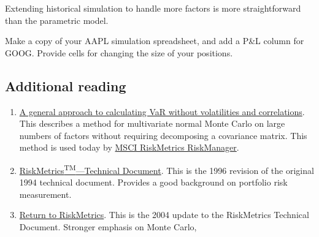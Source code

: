 \documentclass{report}
\numberwithin{problem}{chapter} %
\let\oldroblem\problem
\renewcommand{\problem}{ \oldroblem  \normalfont}
\newcommand{\pnl}{P\&L }
\begin{document}
Extending historical simulation to handle more factors is more straightforward than the parametric model.   

\problem Make a copy of your AAPL simulation spreadsheet, and add a \pnl column for GOOG. Provide cells for changing the size of your positions.



\begin{appendices}
\chapter{Additional reading}
\begin{enumerate}
\item{\href{http://pbenson.github.io/docs/rmm2q97bz.pdf}{A general approach to calculating VaR without volatilities and correlations}. This describes a method for multivariate normal Monte Carlo on large numbers of factors without requiring decomposing a covariance matrix. This method is used today by \href{https://www.msci.com/risk-performance}{MSCI RiskMetrics RiskManager}.}
\item{\href{http://pbenson.github.io/docs/td4e.pdf}{RiskMetrics\textsuperscript{TM}---Technical Document}. This is the 1996 revision of the original 1994 technical document. Provides a good background on portfolio risk measurement.}
\item{\href{http://pbenson.github.io/docs/ReturnToRiskMetrics.pdf}{Return to RiskMetrics}. This is the 2004 update to the  RiskMetrics Technical Document. Stronger emphasis on Monte Carlo, }
\end{enumerate}


\end{appendices}

\printglossaries
\end{document}
